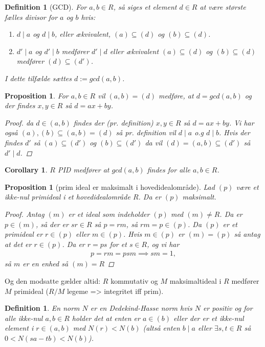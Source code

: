\documentclass[10pt,twoside,openany,final]{memoir}
\theoremstyle{break}
\newtheorem{proposition}[section]{Proposition}
\newtheorem{corollary}[section]{Corollary}
\newtheorem{definition}[section]{Definition}
\theoremstyle{Break}
\begin{document}
\begin{definition}[GCD]
For $a,b \in R$, så siges et element $d \in R$ at være største fælles divisor for $a$ og $b$ hvis:
\begin{enumerate}
\item $d \mid a$ og $d \mid b$, eller ækvivalent, $(a) \subseteq (d)$ og $(b) \subseteq (d)$.
\item $d'\mid a$ og $d' \mid b$ medfører $d' \mid d$ eller ækvivalent $(a) \subseteq (d)$ og $(b) \subseteq (d)$ medfører $(d) \subseteq (d')$.
\end{enumerate}
I dette tilfælde sættes $d:=gcd(a,b)$.
\end{definition}

\begin{proposition}
For $a,b \in R$ vil $(a,b)=(d)$ medføre, at  $d=gcd(a,b)$ og der findes $x,y \in R$ så $d=ax+by$.
\begin{proof}
da $d \in (a,b)$ findes der (pr. definition) $x,y \in R$ så $d=ax+by$. Vi har også $(a),(b) \subseteq (a,b)=(d)$ så pr. definition vil $d \mid a$ o.g $d \mid b$. Hvis der findes $d'$ så $(a) \subseteq (d')$ og $(b) \subseteq (d')$ da vil $(d)=(a,b) \subseteq (d')$ så $d' \mid d$.
\end{proof}
\end{proposition}

\begin{corollary}
$R$ PID medfører at $gcd(a,b)$ findes for alle $a,b \in R$.
\end{corollary}

\begin{proposition}[prim ideal er maksimalt i hovedidealområde]
Lad $(p)$ være et ikke-nul primideal i et hovedidealområde $R$. Da er $(p)$ maksimalt.
\begin{proof}
Antag $(m)$ er et ideal som indeholder $(p)$ med $(m) \neq R$. Da er $p \in (m)$, så der er $sr \in R$ så $p=rm$, så $rm=p\in (p)$. Da $(p)$ er et primideal er $r \in (p)$ eller $m \in (p)$. Hvis $m \in (p)$ er $(m)=(p)$ så antag at det er $r \in (p)$. Da er $r=ps$ for et $s \in R$, og vi har 
\begin{align*}
p=rm=psm \implies sm=1,
\end{align*}
så $m$ er en enhed så $(m)=R$
\end{proof}
\end{proposition}
Og den modsatte gælder altid: $R$ kommutativ og $M$ maksimaltideal i $R$ medfører $M$ primideal ($R/M$ legeme => integritet iff prim).

\begin{definition}
En norm $N$ er en Dedekind-Hasse norm hvis $N$ er positiv og for alle ikke-nul $a,b \in R$ holder det at enten er $a \in (b)$ eller der er et ikke-nul element i $r \in (a,b)$ med $N(r)<N(b)$ (altså enten $b \mid a$ eller $\exists s,t \in R$ så $0 < N(sa-tb)<N(b)$).
\end{definition}
\end{document}
